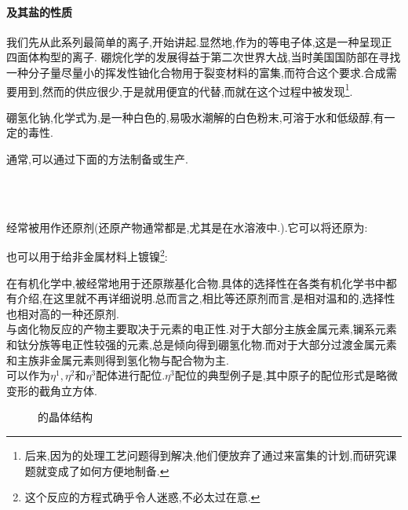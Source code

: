 \documentclass{ctexart}
\begin{document}
\paragraph{及其盐的性质}
我们先从此系列最简单的离子,开始讲起.显然地,作为的等电子体,这是一种呈现正四面体构型的离子.
硼烷化学的发展得益于第二次世界大战,当时美国国防部在寻找一种分子量尽量小的挥发性铀化合物用于裂变材料的富集,而符合这个要求.合成需要用到,然而的供应很少,于是就用便宜的代替,而就在这个过程中被发现\footnote{后来,因为的处理工艺问题得到解决,他们便放弃了通过来富集的计划,而研究课题就变成了如何方便地制备.}.
\begin{substance}[\ce{NaBH4}]
    硼氢化钠,化学式为,是一种白色的,易吸水潮解的白色粉末,可溶于水和低级醇,有一定的毒性.
\end{substance}
\indent 通常,可以通过下面的方法制备或生产.
\begin{center}
    \\
    \\
\end{center}
\indent {}经常被用作还原剂(还原产物通常都是,尤其是在水溶液中.).它可以将还原为:
\begin{center}
\end{center}
也可以用于给非金属材料上镀镍\footnote{这个反应的方程式确乎令人迷惑,不必太过在意.}:
\begin{center}
\end{center}
在有机化学中,被经常地用于还原羰基化合物.具体的选择性在各类有机化学书中都有介绍,在这里就不再详细说明.总而言之,相比等还原剂而言,是相对温和的,选择性也相对高的一种还原剂.\\
\indent {}与卤化物反应的产物主要取决于元素的电正性.对于大部分主族金属元素,镧系元素和钛分族等电正性较强的元素,总是倾向得到硼氢化物.而对于大部分过渡金属元素和主族非金属元素则得到氢化物与配合物为主.\\
\indent {}可以作为$\eta^1,\eta^2$和$\eta^3$配体进行配位.$\eta^3$配位的典型例子是,其中原子的配位形式是略微变形的截角立方体.
\begin{figure}[H]
    \centering
    \caption{的晶体结构}
\end{figure}
\end{document}
